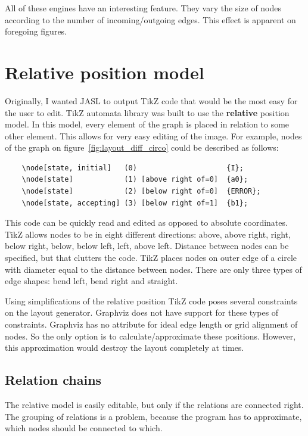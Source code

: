 \documentclass{ctuthesis}
\begin{document}
All of these engines have an interesting feature. They vary the size of nodes according to the number of incoming/outgoing edges. This effect is apparent on foregoing figures.

\section{Relative position model}
\label{sec:relpos}
Originally, I wanted JASL to output TikZ code that would be the most easy for the user to edit. TikZ automata library was built to use the \textbf{relative} position model. In this model, every element of the graph is placed in relation to some other element. This allows for very easy editing of the image. For example, nodes of the graph on figure~\ref{fig:layout_diff_circo} could be described as follows:

\begin{verbatim}
	\node[state, initial] 	(0) 					{I};
	\node[state] 			(1) [above right of=0] 	{a0};
	\node[state] 			(2) [below right of=0] 	{ERROR};
	\node[state, accepting] (3) [below right of=1] 	{b1};
\end{verbatim}

This code can be quickly read and edited as opposed to absolute coordinates. TikZ allows nodes to be in eight different directions: above, above right, right, below right, below, below left, left, above left. Distance between nodes can be specified, but that clutters the code. TikZ places nodes on outer edge of a circle with diameter equal to the distance between nodes. There are only three types of edge shapes: bend left, bend right and straight. 

Using simplifications of the relative position TikZ code poses several constraints on the layout generator. Graphviz does not have support for these types of constraints. Graphviz has no attribute for ideal edge length or grid alignment of nodes. So the only option is to calculate/approximate these positions. However, this approximation would destroy the layout completely at times. 

\subsection{Relation chains}
The relative model is easily editable, but only if the relations are connected right. The grouping of relations is a problem, because the program has to approximate, which nodes should be connected to which.
\end{document}
